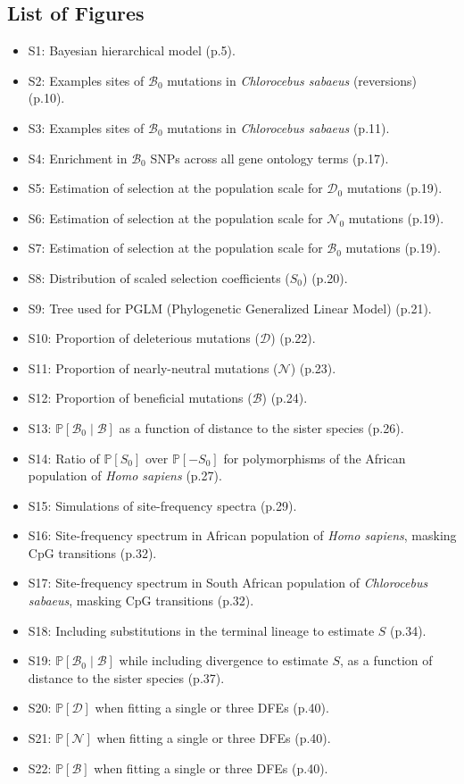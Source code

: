 \documentclass{article}
\newcommand{\proba}{\mathbb{P}}
\newcommand{\Sphy}{S_{0}}
\newcommand{\SphyDel}{\mathcal{D}_0}
\newcommand{\SphyNeu}{\mathcal{N}_0}
\newcommand{\SphyBen}{\mathcal{B}_0}
\newcommand{\given}{\mid}
\newcommand{\Spop}{S}
\newcommand{\SpopDel}{\mathcal{D}}
\newcommand{\SpopNeu}{\mathcal{N}}
\newcommand{\SpopBen}{\mathcal{B}}
\begin{document}
    \subsection*{List of Figures}
    \begin{itemize}
        \item S1: Bayesian hierarchical model (p.5).
        \item S2: Examples sites of $\SphyBen$ mutations in \textit{Chlorocebus sabaeus} (reversions) (p.10).
        \item S3: Examples sites of $\SphyBen$ mutations in \textit{Chlorocebus sabaeus} (p.11).
        \item S4: Enrichment in $\SphyBen$ SNPs across all gene ontology terms (p.17).
        \item S5: Estimation of selection at the population scale for $\SphyDel$ mutations (p.19).
        \item S6: Estimation of selection at the population scale for $\SphyNeu$ mutations (p.19).
        \item S7: Estimation of selection at the population scale for $\SphyBen$ mutations (p.19).
        \item S8: Distribution of scaled selection coefficients ($\Sphy$) (p.20).
        \item S9: Tree used for PGLM (Phylogenetic Generalized Linear Model) (p.21).
        \item S10: Proportion of deleterious mutations ($\SpopDel$) (p.22).
        \item S11: Proportion of nearly-neutral mutations ($\SpopNeu$) (p.23).
        \item S12: Proportion of beneficial mutations ($\SpopBen$) (p.24).
        \item S13: $\proba[\SphyBen\given \SpopBen ]$ as a function of distance to the sister species (p.26).
        \item S14: Ratio of $\proba[\Sphy]$ over $\proba[-\Sphy]$ for polymorphisms of the African population of \textit{Homo sapiens} (p.27).
        \item S15: Simulations of site-frequency spectra (p.29).
        \item S16: Site-frequency spectrum in African population of \textit{Homo sapiens}, masking CpG transitions  (p.32).
        \item S17: Site-frequency spectrum in South African population of \textit{Chlorocebus sabaeus}, masking CpG transitions (p.32).
        \item S18: Including substitutions in the terminal lineage to estimate $\Spop$ (p.34).
        \item S19: $\proba[\SphyBen\given \SpopBen ]$ while including divergence to estimate $\Spop$, as a function of distance to the sister species (p.37).
        \item S20: $\proba [ \SpopDel ]$ when fitting a single or three DFEs (p.40).
        \item S21: $\proba [ \SpopNeu ]$ when fitting a single or three DFEs (p.40).
        \item S22: $\proba [ \SpopBen ]$ when fitting a single or three DFEs (p.40).
    \end{itemize}
\end{document}
